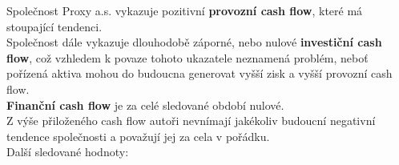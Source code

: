 
Společnost Proxy a.s. vykazuje pozitivní \textbf{provozní cash flow}, které má stoupající tendenci.\\

Společnost dále vykazuje dlouhodobě záporné, nebo nulové \textbf{investiční cash flow}, což vzhledem k povaze tohoto ukazatele neznamená problém, neboť pořízená aktiva mohou do budoucna generovat vyšší zisk a vyšší provozní cash flow.\\

\textbf{Finanční cash flow} je za celé sledované období nulové.\\

Z výše přiloženého cash flow autoři nevnímají jakékoliv budoucní negativní tendence společnosti a považují jej za cela v pořádku.\\

Další sledované hodnoty:\\

